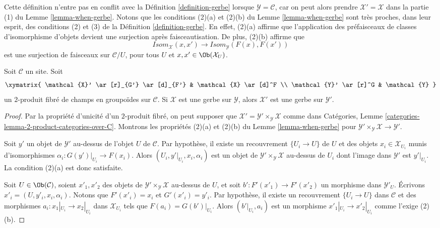 \noindent
Cette définition n'entre pas en conflit avec la
Définition \ref{definition-gerbe}
lorsque $\mathcal{Y} = \mathcal{C}$, car on peut alors prendre
$\mathcal{X}' = \mathcal{X}$ dans la partie (1) du
Lemme \ref{lemma-when-gerbe}.
Notons que les conditions (2)(a) et (2)(b) du
Lemme \ref{lemma-when-gerbe}
sont très proches, dans leur esprit, des conditions (2) et (3) de la
Définition \ref{definition-gerbe}.
En effet, (2)(a) affirme que l'application des préfaisceaux de classes
d'isomorphisme d'objets devient une surjection après faisceautisation.
De plus, (2)(b) affirme que
$$
\mathit{Isom}_\mathcal{X}(x, x')
\longrightarrow
\mathit{Isom}_\mathcal{Y}(F(x), F(x'))
$$
est une surjection de faisceaux sur $\mathcal{C}/U$, pour tous $U$ et
$x, x' \in \Ob(\mathcal{X}_U)$.

\begin{lemma}
\label{lemma-base-change-gerbe}
Soit $\mathcal{C}$ un site. Soit
$$
\xymatrix{
\mathcal{X}' \ar[r]_{G'} \ar[d]_{F'} & \mathcal{X} \ar[d]^F \\
\mathcal{Y}' \ar[r]^G & \mathcal{Y}
}
$$
un $2$-produit fibré de champs en groupoïdes sur $\mathcal{C}$.
Si $\mathcal{X}$ est une gerbe sur $\mathcal{Y}$, alors
$\mathcal{X}'$ est une gerbe sur $\mathcal{Y}'$.
\end{lemma}

\begin{proof}
Par la propriété d'unicité d'un $2$-produit fibré, on peut supposer que
$\mathcal{X}' = \mathcal{Y}' \times_\mathcal{Y} \mathcal{X}$
comme dans
Catégories, Lemme \ref{categories-lemma-2-product-categories-over-C}.
Montrons les propriétés (2)(a) et (2)(b) du
Lemme \ref{lemma-when-gerbe}
pour $\mathcal{Y}' \times_\mathcal{Y} \mathcal{X} \to \mathcal{Y}'$.

\medskip\noindent
Soit $y'$ un objet de $\mathcal{Y}'$ au-dessus de l'objet $U$
de $\mathcal{C}$. Par hypothèse, il existe
un recouvrement $\{U_i \to U\}$ de $U$ et des objets
$x_i \in \mathcal{X}_{U_i}$ munis d'isomorphismes
$\alpha_i : G(y')|_{U_i} \to F(x_i)$.
Alors $(U_i, y'|_{U_i}, x_i, \alpha_i)$ est un objet de
$\mathcal{Y}' \times_\mathcal{Y} \mathcal{X}$ au-dessus de $U_i$
dont l'image dans $\mathcal{Y}'$ est $y'|_{U_i}$. La condition (2)(a) est donc satisfaite.

\medskip\noindent
Soit $U \in \Ob(\mathcal{C})$, soient $x'_1, x'_2$ des objets de
$\mathcal{Y}' \times_\mathcal{Y} \mathcal{X}$ au-dessus de $U$, et soit
$b' : F'(x'_1) \to F'(x'_2)$ un morphisme dans $\mathcal{Y}'_U$.
Écrivons $x'_i = (U, y'_i, x_i, \alpha_i)$. Notons que $F'(x'_i) = x_i$
et $G'(x'_i) = y'_i$. Par hypothèse, il existe
un recouvrement $\{U_i \to U\}$ dans $\mathcal{C}$ et des morphismes
$a_i : x_1|_{U_i} \to x_2|_{U_i}$ dans $\mathcal{X}_{U_i}$ tels que
$F(a_i) = G(b')|_{U_i}$. Alors $(b'|_{U_i}, a_i)$ est un morphisme
$x'_1|_{U_i} \to x'_2|_{U_i}$ comme l'exige (2)(b).
\end{proof}

